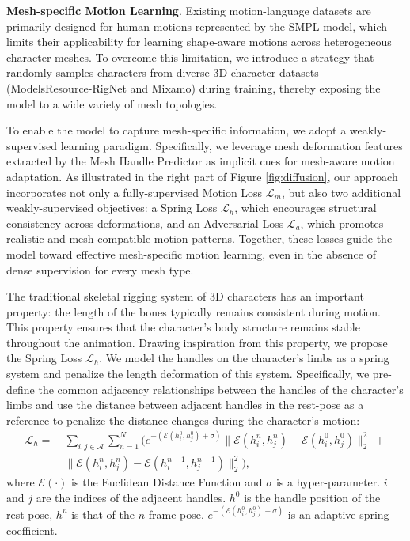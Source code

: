 \documentclass[lettersize,journal]{IEEEtran}
\newcommand{\blu}[1]{\texorpdfstring{{\leavevmode\color{blue}#1}}{#1}}
\begin{document}
\textbf{Mesh-specific Motion Learning}. Existing motion-language datasets are primarily designed for human motions represented by the SMPL model, which limits their applicability for learning shape-aware motions across heterogeneous character meshes. To overcome this limitation, we introduce a strategy that randomly samples characters from diverse 3D character datasets \blu{(ModelsResource-RigNet\cite{xu2019predicting} and Mixamo\cite{mixamo})} during training, thereby exposing the model to a wide variety of mesh topologies.

To enable the model to capture mesh-specific information, we adopt a weakly-supervised learning paradigm. Specifically, we leverage mesh deformation features extracted by the Mesh Handle Predictor as implicit cues for mesh-aware motion adaptation. As illustrated in the right part of Figure \ref{fig:diffusion}, our approach incorporates not only a fully-supervised Motion Loss $\mathcal{L}_m$, but also two additional weakly-supervised objectives: a Spring Loss $\mathcal{L}_h$, which encourages structural consistency across deformations, and an Adversarial Loss $\mathcal{L}_a$, which promotes realistic and mesh-compatible motion patterns. Together, these losses guide the model toward effective mesh-specific motion learning, even in the absence of dense supervision for every mesh type.

The traditional skeletal rigging system of 3D characters has an important property: the length of the bones typically remains consistent during motion. This property ensures that the character's body structure remains stable throughout the animation. Drawing inspiration from this property, we propose the Spring Loss $\mathcal{L}_h$. We model the handles on the character's limbs as a spring system and penalize the length deformation of this system. Specifically, we pre-define the common adjacency relationships between the handles of the character's limbs and use the distance between adjacent handles in the rest-pose as a reference to penalize the distance changes during the character's motion:
\begin{equation} \label{Eq.10}
\begin{aligned}
\mathcal{L}_{h} = &~\sum_{i,j \in \mathcal{A}}\sum_{n=1}^{N} \Big ( e^{-\left(\mathcal{E}(h_{i}^{0},h_{j}^{0}) + \sigma \right)} \lVert \mathcal{E}(h_{i}^{n},h_{j}^{n}) -  \mathcal{E}(h_{i}^{0},h_{j}^{0}) \rVert_{2}^{2} ~+ \\ 
&~\lVert \mathcal{E}(h_{i}^{n},h_{j}^{n}) - \mathcal{E}(h_{i}^{n-1},h_{j}^{n-1}) \rVert_{2}^{2} \Big ),
\end{aligned}
\end{equation}
where $\mathcal{E}(\cdot)$ is the Euclidean Distance Function and $\sigma$ is a hyper-parameter. $i$ and $j$ are the indices of the adjacent handles. $h^{0}$ is the handle position of the rest-pose, $h^{n}$ is that of the $n$-frame pose. $e^{-\left(\mathcal{E}(h_{i}^{0},h_{j}^{0}) + \sigma \right)}$ is an adaptive spring coefficient.
\end{document}
